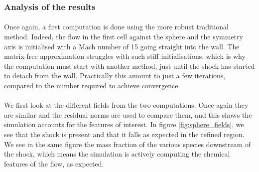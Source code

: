       \subsubsection{Analysis of the results}

        \paragraph{}
        Once again, a first computation is done using the more robust traditional method.
        Indeed, the flow in the first cell against the sphere and the symmetry axis is initialised with a Mach number of 15 going straight into the wall.
        The matrix-free approximation struggles with such stiff initialisations, which is why the computation must start with another method, just until the shock has started to detach from the wall.
        Practically this amount to just a few iterations, compared to the number required to achieve convergence.

        \paragraph{}
        We first look at the different fields from the two computations.
        Once again they are similar and the residual norms are used to compare them, and this shows the simulation accounts for the features of interest.
        In figure \ref{fig:sphere_fields}, we see that the shock is present and that it falls as expected in the refined region.
        We see in the same figure the mass fraction of the various species downstream of the shock, which means the simulation is actively computing the chemical features of the flow, as expected.


